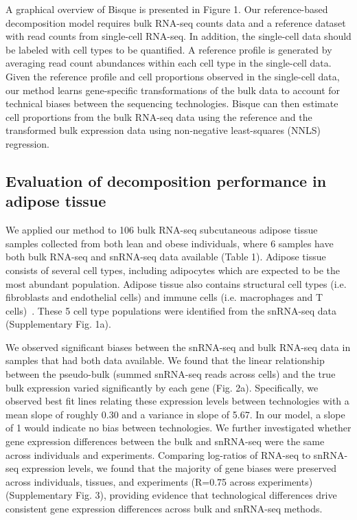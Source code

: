 A graphical overview of Bisque is presented in Figure 1. Our reference-based decomposition model requires bulk RNA-seq counts data and a reference dataset with read counts from single-cell RNA-seq. In addition, the single-cell data should be labeled with cell types to be quantified. A reference profile is generated by averaging read count abundances within each cell type in the single-cell data. Given the reference profile and cell proportions observed in the single-cell data, our method learns gene-specific transformations of the bulk data to account for technical biases between the sequencing technologies. Bisque can then estimate cell proportions from the bulk RNA-seq data using the reference and the transformed bulk expression data using non-negative least-squares (NNLS) regression. 

\subsection{Evaluation of decomposition performance in adipose tissue}
We applied our method to 106 bulk RNA-seq subcutaneous adipose tissue samples collected from both lean and obese individuals, where 6 samples have both bulk RNA-seq and snRNA-seq data available (Table 1). Adipose tissue consists of several cell types, including adipocytes which are expected to be the most abundant population. Adipose tissue also contains structural cell types (i.e. fibroblasts and endothelial cells) and immune cells (i.e. macrophages and T cells)~\cite{Esteve_Rafols2014-ia}. These 5 cell type populations were identified from the snRNA-seq data (Supplementary Fig. 1a).

We observed significant biases between the snRNA-seq and bulk RNA-seq data in samples that had both data available. We found that the linear relationship between the pseudo-bulk (summed snRNA-seq reads across cells) and the true bulk expression varied significantly by each gene (Fig. 2a). Specifically, we observed best fit lines relating these expression levels between technologies with a mean slope of roughly 0.30 and a variance in slope of 5.67. In our model, a slope of 1 would indicate no bias between technologies. We further investigated whether gene expression differences between the bulk and snRNA-seq were the same across individuals and experiments. Comparing log-ratios of RNA-seq to snRNA-seq expression levels, we found that the majority of gene biases were preserved across individuals, tissues, and experiments (R=0.75 across experiments) (Supplementary Fig. 3), providing evidence that technological differences drive consistent gene expression differences across bulk and snRNA-seq methods. 

